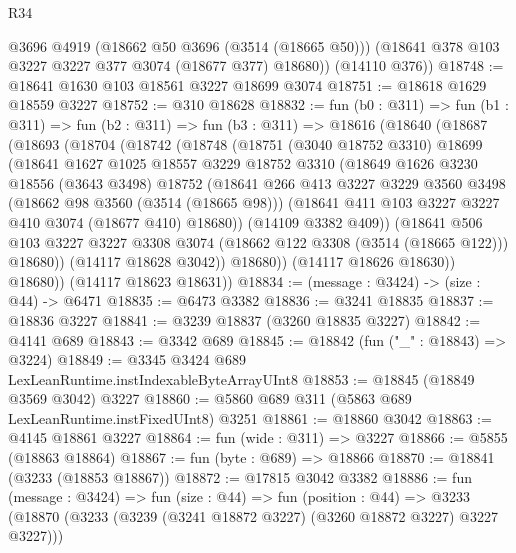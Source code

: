\begin{lexlean}{R34}
\begin{coremodule}
        @3696
        @4919
        (@18662 @50 @3696 (@3514 (@18665 @50)))
        (@18641 @378 @103 @3227 @3227 @377 @3074 (@18677 @377) @18680))
      (@14110 @376))
@18748 := @18641 @1630 @103 @18561 @3227 @18699 @3074
@18751 := @18618 @1629 @18559 @3227
@18752 := @310 @18628
@18832 := fun (b0 : @311) =>
  fun (b1 : @311) =>
  fun (b2 : @311) =>
  fun (b3 : @311) =>
  @18616
    (@18640
      (@18687
        (@18693
          (@18704
            (@18742
              (@18748
                (@18751
                  (@3040 @18752 @3310)
                  @18699
                  (@18641
                    @1627
                    @1025
                    @18557
                    @3229
                    @18752
                    @3310
                    (@18649
                      @1626
                      @3230
                      @18556
                      (@3643 @3498)
                      @18752
                      (@18641
                        @266
                        @413
                        @3227
                        @3229
                        @3560
                        @3498
                        (@18662 @98 @3560 (@3514 (@18665 @98)))
                        (@18641 @411 @103 @3227 @3227 @410 @3074 (@18677 @410) @18680))
                      (@14109 @3382 @409))
                    (@18641
                      @506
                      @103
                      @3227
                      @3227
                      @3308
                      @3074
                      (@18662 @122 @3308 (@3514 (@18665 @122)))
                      @18680))
                  (@14117 @18628 @3042))
                @18680))
            (@14117 @18626 @18630))
          @18680))
      (@14117 @18623 @18631))
@18834 := (message : @3424) -> (size : @44) -> @6471
@18835 := @6473 @3382
@18836 := @3241 @18835
@18837 := @18836 @3227
@18841 := @3239 @18837 (@3260 @18835 @3227)
@18842 := @4141 @689
@18843 := @3342 @689
@18845 := @18842 (fun ("_" : @18843) => @3224)
@18849 := @3345 @3424 @689 LexLeanRuntime.instIndexableByteArrayUInt8
@18853 := @18845 (@18849 @3569 @3042) @3227
@18860 := @5860 @689 @311 (@5863 @689 LexLeanRuntime.instFixedUInt8) @3251
@18861 := @18860 @3042
@18863 := @4145 @18861 @3227
@18864 := fun (wide : @311) => @3227
@18866 := @5855 (@18863 @18864)
@18867 := fun (byte : @689) => @18866
@18870 := @18841 (@3233 (@18853 @18867))
@18872 := @17815 @3042 @3382
@18886 := fun (message : @3424) =>
  fun (size : @44) =>
  fun (position : @44) =>
  @3233 (@18870 (@3233 (@3239 (@3241 @18872 @3227) (@3260 @18872 @3227) @3227 @3227)))

\end{coremodule}
\end{lexlean}
